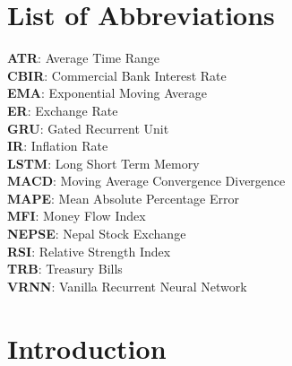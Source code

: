 \chapter*{List of Abbreviations}
\textbf{ATR}:      Average Time Range\\
\textbf{CBIR}:   Commercial Bank Interest Rate\\
\textbf{EMA}:     Exponential Moving Average\\
\textbf{ER}:        Exchange Rate\\
\textbf{GRU}:    Gated Recurrent Unit\\
\textbf{IR}:         Inflation Rate \\
\textbf{LSTM}:  Long Short Term Memory\\
\textbf{MACD}:  Moving Average Convergence Divergence\\
\textbf{MAPE}:   Mean Absolute Percentage Error\\
\textbf{MFI}:       Money Flow Index\\
\textbf{NEPSE}:  Nepal Stock Exchange\\
\textbf{RSI}:        Relative Strength Index\\
\textbf{TRB}:      Treasury Bills\\
\textbf{VRNN}: Vanilla Recurrent Neural Network\\


\newpage
{} %

\chapter{Introduction}
\vspace{-18pt}

